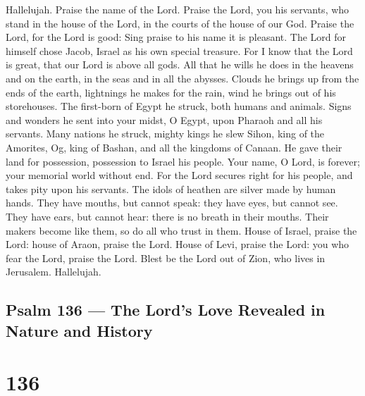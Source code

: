  Hallelujah. Praise the name of the Lord. Praise the Lord,
you his servants,  who stand in the house of the Lord, in
the courts of the house of our God.  Praise the Lord, for
the Lord is good: Sing praise to his name it is pleasant. 
The Lord for himself chose Jacob, Israel as his own special treasure.
 For I know that the Lord is great, that our Lord is above
all gods.  All that he wills he does in the heavens and on
the earth, in the seas and in all the abysses.  Clouds he
brings up from the ends of the earth, lightnings he makes for the rain,
wind he brings out of his storehouses.  The first-born of
Egypt he struck, both humans and animals.  Signs and wonders
he sent into your midst, O Egypt, upon Pharaoh and all his servants.
 Many nations he struck, mighty kings he slew 
Sihon, king of the Amorites, Og, king of Bashan, and all the kingdoms of
Canaan.  He gave their land for possession, possession to
Israel his people.  Your name, O Lord, is forever; your
memorial world without end.  For the Lord secures right for
his people, and takes pity upon his servants.  The idols of
heathen are silver made by human hands.  They have mouths,
but cannot speak: they have eyes, but cannot see.  They
have ears, but cannot hear: there is no breath in their mouths.
 Their makers become like them, so do all who trust in
them.  House of Israel, praise the Lord: house of Araon,
praise the Lord.  House of Levi, praise the Lord: you who
fear the Lord, praise the Lord.  Blest be the Lord out of
Zion, who lives in Jerusalem. Hallelujah.

\hypertarget{psalm-136-the-lords-love-revealed-in-nature-and-history}{%
\subsection{Psalm 136 --- The Lord's Love Revealed in Nature and
History}\label{psalm-136-the-lords-love-revealed-in-nature-and-history}}

\hypertarget{section-135}{%
\section{136}\label{section-135}}

